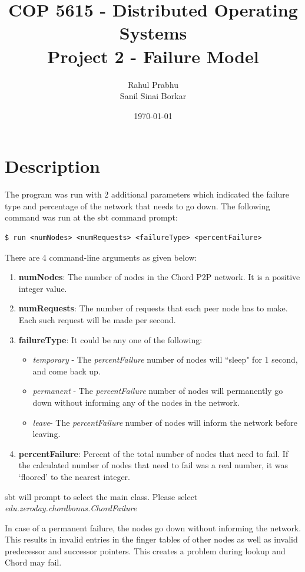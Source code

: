 \documentclass[11pt]{article}
\title{\textbf{COP 5615 - Distributed Operating Systems\\Project 2 - Failure Model}}
\author{Rahul Prabhu\\
		Sanil Sinai Borkar}
\date{\today}
\begin{document}
\maketitle

\section{Description}
The program was run with 2 additional parameters which indicated the failure type and percentage of the network that needs to go down. The following command was run at the sbt command prompt:
\begin{lstlisting}
$ run <numNodes> <numRequests> <failureType> <percentFailure>
\end{lstlisting}


There are 4 command-line arguments as given below:
\begin{enumerate}
\item \textbf{numNodes}: The number of nodes in the Chord P2P network. It is a positive integer value.
\item \textbf{numRequests}: The number of requests that each peer node has to make. Each such request will be made per second.
\item \textbf{failureType}: It could be any one of the following:
\begin{itemize}
\item {\it temporary} - The {\it percentFailure} number of nodes will ``sleep" for 1 second, and come back up.
\item {\it permanent} - The {\it percentFailure} number of nodes will permanently go down without informing any of the nodes in the network.
\item {\it leave}- The {\it percentFailure} number of nodes will inform the network before leaving.
\end{itemize}
\item \textbf{percentFailure}: Percent of the total number of nodes that need to fail. If the calculated number of nodes that need to fail was a real number, it was `floored' to the nearest integer.
\end{enumerate}

sbt will prompt to select the main class. Please select\\ \textit{edu.zeroday.chordbonus.ChordFailure}

In case of a permanent failure, the nodes go down without informing the network. This results in invalid entries in the finger tables of other nodes as well as invalid predecessor and successor pointers. This creates a problem during lookup and Chord may fail.
\end{document}
